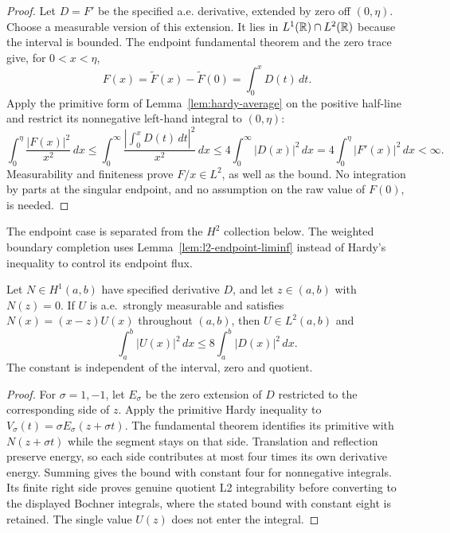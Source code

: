 \begin{proof}
\leanok
Let $D=F'$ be the specified a.e. derivative, extended by zero off
$(0,\eta)$. Choose a measurable version of this extension.
It lies in $L^1(\mathbb{R})\cap L^2(\mathbb{R})$ because the interval is bounded.
The endpoint fundamental theorem and the zero trace give, for $0<x<\eta$,
\[
 F(x)=\widetilde F(x)-\widetilde F(0)=\int_0^xD(t)\,dt.
\]
Apply the primitive form of Lemma~\ref{lem:hardy-average} on the positive
half-line and restrict its nonnegative left-hand integral to $(0,\eta)$:
\[
 \int_0^\eta\frac{|F(x)|^2}{x^2}\,dx
 \le\int_0^\infty\frac{|\int_0^xD(t)\,dt|^2}{x^2}\,dx
 \le4\int_0^\infty|D(x)|^2\,dx
 =4\int_0^\eta|F'(x)|^2\,dx<\infty.
\]
Measurability and finiteness prove $F/x\in L^2$, as well as the bound.
No integration by parts at the singular endpoint, and no assumption on
the raw value of $F(0)$, is needed.
\end{proof}

\begin{remark}
The endpoint case is separated from the $H^2$ collection below.
The weighted boundary completion uses Lemma~\ref{lem:l2-endpoint-liminf}
instead of Hardy's inequality to control its endpoint flux.
\end{remark}

\begin{lemma}
\label{lem:hardy-interior-linear}
\leanok
Let $N\in H^1(a,b)$ have specified derivative $D$, and let
$z\in(a,b)$ with $N(z)=0$. If $U$ is a.e.\ strongly measurable and satisfies
$N(x)=(x-z)U(x)$ throughout $(a,b)$, then $U\in L^2(a,b)$ and
\[
 \int_a^b|U(x)|^2\,dx\le8\int_a^b|D(x)|^2\,dx.
\]
The constant is independent of the interval, zero and quotient.
\end{lemma}

\begin{proof}
\leanok
For $\sigma=1,-1$, let $E_\sigma$ be the zero extension of $D$
restricted to the corresponding side of $z$. Apply the primitive Hardy
inequality to $V_\sigma(t)=\sigma E_\sigma(z+\sigma t)$.
The fundamental theorem identifies its primitive with $N(z+\sigma t)$
while the segment stays on that side. Translation and reflection preserve
energy, so each side contributes at most four times its own derivative
energy. Summing gives the bound with constant four for nonnegative
integrals. Its finite right side proves genuine quotient L2 integrability
before converting to the displayed Bochner integrals, where the stated
bound with constant eight is retained.
The single value $U(z)$ does not enter the integral.
\end{proof}

